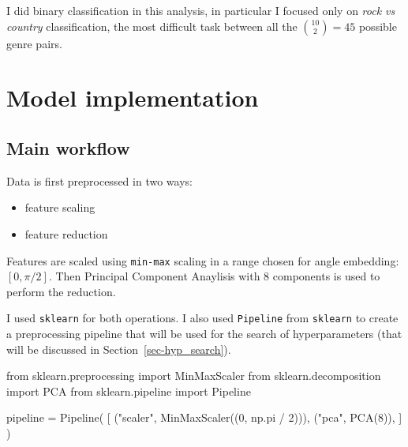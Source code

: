 \documentclass[
  13pt,
  a4paper,
  DIV=11,
  numbers=noendperiod]{scrreprt}
\newenvironment{Shaded}{\begin{snugshade}}{\end{snugshade}}
\newcommand{\DecValTok}[1]{\textcolor[rgb]{0.68,0.00,0.00}{#1}}
\newcommand{\ImportTok}[1]{\textcolor[rgb]{0.00,0.46,0.62}{#1}}
\newcommand{\NormalTok}[1]{\textcolor[rgb]{0.00,0.23,0.31}{#1}}
\newcommand{\OperatorTok}[1]{\textcolor[rgb]{0.37,0.37,0.37}{#1}}
\newcommand{\StringTok}[1]{\textcolor[rgb]{0.13,0.47,0.30}{#1}}
\providecommand{\tightlist}{%
  \setlength{\itemsep}{0pt}\setlength{\parskip}{0pt}}\usepackage{longtable,booktabs,array}
\begin{document}
I did binary classification in this analysis, in particular I focused
only on \emph{rock vs country} classification, the most difficult task
between all the \(\binom{10}{2} = 45\) possible genre pairs.

\section{Model implementation}\label{model-implementation}

\subsection{Main workflow}\label{main-workflow}

Data is first preprocessed in two ways:

\begin{itemize}
\tightlist
\item
  feature scaling\\
\item
  feature reduction
\end{itemize}

Features are scaled using \texttt{min-max} scaling in a range chosen for
angle embedding: \([0, \pi/2]\). Then Principal Component Anaylisis with
8 components is used to perform the reduction.

I used \texttt{sklearn} for both operations. I also used
\texttt{Pipeline} from \texttt{sklearn} to create a preprocessing
pipeline that will be used for the search of hyperparameters (that will
be discussed in Section~\ref{sec-hyp_search}).

\begin{Shaded}
\begin{Highlighting}[numbers=left,,]
\ImportTok{from}\NormalTok{ sklearn.preprocessing }\ImportTok{import}\NormalTok{ MinMaxScaler}
\ImportTok{from}\NormalTok{ sklearn.decomposition }\ImportTok{import}\NormalTok{ PCA}
\ImportTok{from}\NormalTok{ sklearn.pipeline }\ImportTok{import}\NormalTok{ Pipeline}

\NormalTok{pipeline }\OperatorTok{=}\NormalTok{ Pipeline(}
\NormalTok{    [}
\NormalTok{        (}\StringTok{"scaler"}\NormalTok{, MinMaxScaler((}\DecValTok{0}\NormalTok{, np.pi }\OperatorTok{/} \DecValTok{2}\NormalTok{))),}
\NormalTok{        (}\StringTok{"pca"}\NormalTok{, PCA(}\DecValTok{8}\NormalTok{)),}
\NormalTok{    ]}
\NormalTok{)}
\end{Highlighting}
\end{Shaded}
\end{document}
